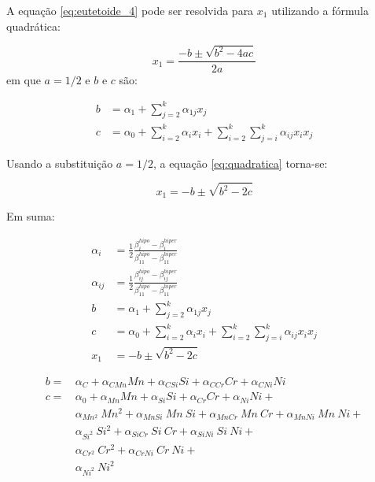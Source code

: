 \documentclass[brazil,tf,epusp]{usp}  %
\begin{document}
A equação \ref{eq:eutetoide_4} pode ser resolvida para $x_1$ utilizando a fórmula quadrática:

\begin{equation}
	x_1 = \frac{-b \pm \sqrt{b^2 - 4 a c}}{2 a}
	\label{eq:quadratica}
\end{equation}
%
em que $a = 1/2$ e $b$ e $c$ são:

\begin{align}
	b &= \alpha_1 + \sum_{j=2}^k \alpha_{1j} x_j \\
	c &= \alpha_0
	+ \sum_{i=2}^k \alpha_i x_i
	+ \sum_{i=2}^{k} \sum_{j=i}^k \alpha_{ij} x_i x_j
\end{align}

Usando a substituição $a = 1/2$, a equação \ref{eq:quadratica} torna-se:

\begin{equation}
	x_1 = -b \pm \sqrt{b^2 - 2 c}
	\label{eq:quadratica_2}
\end{equation}

Em suma:

\begin{align*}
	\alpha_i &= \frac{1}{2} \frac{\beta_i^{hipo} - \beta_i^{hiper}}{\beta_{11}^{hipo} - \beta_{11}^{hiper}}\\
	\alpha_{ij} &= \frac{1}{2} \frac{\beta_{ij}^{hipo} - \beta_{ij}^{hiper}}{\beta_{11}^{hipo} - \beta_{11}^{hiper}}\\
	b &= \alpha_1 + \sum_{j=2}^k \alpha_{1j} x_j \\
	c &= \alpha_0
	+ \sum_{i=2}^k \alpha_i x_i
	+ \sum_{i=2}^{k} \sum_{j=i}^k \alpha_{ij} x_i x_j \\
	x_1 &= -b \pm \sqrt{b^2 - 2 c}
\end{align*}

\begin{align}
	b =&\,\alpha_{C} + \alpha_{C Mn} Mn + \alpha_{C Si} Si + \alpha_{C Cr} Cr + \alpha_{C Ni} Ni\\
	c =&\,\alpha_0 + \alpha_{Mn} Mn + \alpha_{Si} Si + \alpha_{Cr} Cr + \alpha_{Ni} Ni + \nonumber \\
	   &\,\alpha_{Mn^2}\ Mn^2 + \alpha_{Mn Si}\ Mn\ Si + \alpha_{Mn Cr}\ Mn\ Cr + \alpha_{Mn Ni}\ Mn\ Ni + \nonumber \\
	   &\,\alpha_{Si^2}\ Si^2 + \alpha_{Si Cr}\ Si\ Cr + \alpha_{Si Ni}\ Si\ Ni + \nonumber \\
	   &\,\alpha_{Cr^2}\ Cr^2 + \alpha_{Cr Ni}\ Cr\ Ni + \nonumber \\
	   &\,\alpha_{Ni^2}\ Ni^2
\end{align}
\end{document}

